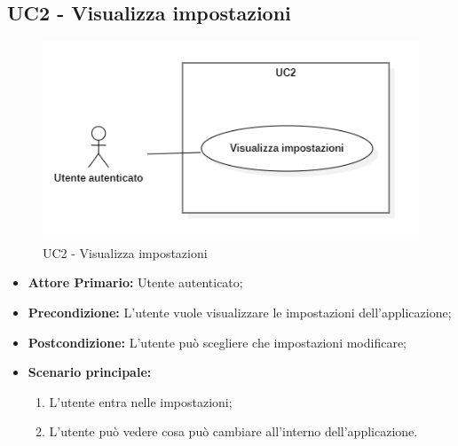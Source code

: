 \subsection{UC2 - Visualizza impostazioni}
\begin{figure}[H]
    \centering
    \includegraphics[scale = 0.7]{components/img/UC2.png}
    \caption{UC2 - Visualizza impostazioni}
\end{figure}
\begin{itemize}
\item \textbf{Attore Primario:} Utente autenticato;
\item \textbf{Precondizione:} L'utente vuole visualizzare le impostazioni dell'applicazione;
\item \textbf{Postcondizione:} L'utente può scegliere che impostazioni modificare;
\item \textbf{Scenario principale:}
    \begin{enumerate}
    \item L'utente entra nelle impostazioni;
    \item L'utente può vedere cosa può cambiare all'interno dell'applicazione.
    \end{enumerate}
\end{itemize}

